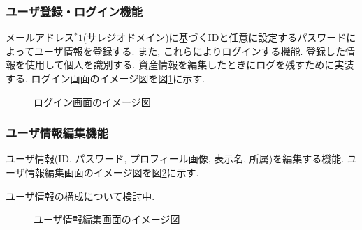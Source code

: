 \documentclass[11ptm]{jsarticle}
\begin{document}
\clearpage
\subsubsection{ユーザ登録・ログイン機能}
\label{subsec:ユーザ登録・ログイン機能}
メールアドレス$^*1$(サレジオドメイン)に基づくIDと任意に設定するパスワードによってユーザ情報を登録する. また, これらによりログインする機能. 登録した情報を使用して個人を識別する. 資産情報を編集したときにログを残すために実装する. ログイン画面のイメージ図を図\ref{fig:ログイン画面のイメージ図}に示す. 
\begin{figure}[h]
  \centering
  \caption{\label{fig:ログイン画面のイメージ図}ログイン画面のイメージ図}
\end{figure}

\clearpage
\subsubsection{ユーザ情報編集機能}
\label{subsec:ユーザ情報編集機能}
ユーザ情報(ID, パスワード, プロフィール画像, 表示名, 所属)を編集する機能. ユーザ情報編集画面のイメージ図を図\ref{fig:ユーザ情報編集画面のイメージ図}に示す. \par
ユーザ情報の構成について検討中.
\begin{figure}[h]
  \centering
  \caption{\label{fig:ユーザ情報編集画面のイメージ図}ユーザ情報編集画面のイメージ図}
\end{figure}
\end{document}
